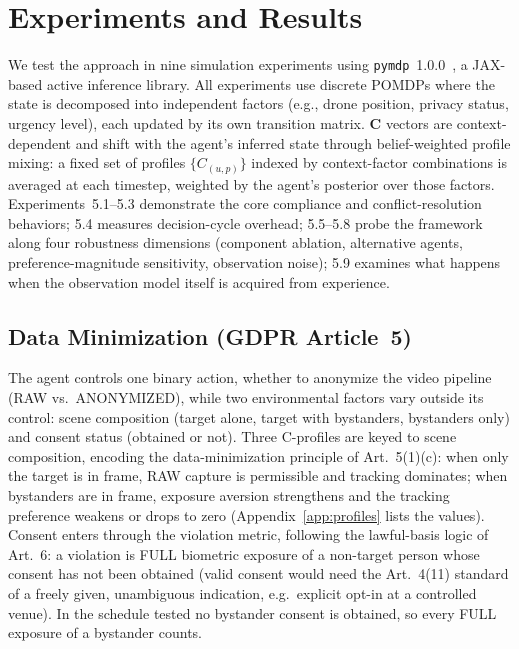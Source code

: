 \documentclass[10pt,twocolumn]{article}
\begin{document}
\section{Experiments and Results}
\label{sec:experiments}

We test the approach in nine simulation experiments using \texttt{pymdp}~1.0.0~\cite{heins2022}, a JAX-based active inference library. All experiments use discrete POMDPs where the state is decomposed into independent factors (e.g., drone position, privacy status, urgency level), each updated by its own transition matrix. $\mathbf{C}$ vectors are context-dependent and shift with the agent's inferred state through belief-weighted profile mixing: a fixed set of profiles $\{C_{(u,p)}\}$ indexed by context-factor combinations is averaged at each timestep, weighted by the agent's posterior over those factors. Experiments~5.1--5.3 demonstrate the core compliance and conflict-resolution behaviors; 5.4 measures decision-cycle overhead; 5.5--5.8 probe the framework along four robustness dimensions (component ablation, alternative agents, preference-magnitude sensitivity, observation noise); 5.9 examines what happens when the observation model itself is acquired from experience.


\subsection{Data Minimization (GDPR Article~5)}

The agent controls one binary action, whether to anonymize the video pipeline (RAW vs.\ ANONYMIZED), while two environmental factors vary outside its control: scene composition (target alone, target with bystanders, bystanders only) and consent status (obtained or not). Three C-profiles are keyed to scene composition, encoding the data-minimization principle of Art.~5(1)(c): when only the target is in frame, RAW capture is permissible and tracking dominates; when bystanders are in frame, exposure aversion strengthens and the tracking preference weakens or drops to zero (Appendix~\ref{app:profiles} lists the values). Consent enters through the violation metric, following the lawful-basis logic of Art.~6: a violation is FULL biometric exposure of a non-target person whose consent has not been obtained (valid consent would need the Art.~4(11) standard of a freely given, unambiguous indication, e.g.\ explicit opt-in at a controlled venue). In the schedule tested no bystander consent is obtained, so every FULL exposure of a bystander counts.
\end{document}
